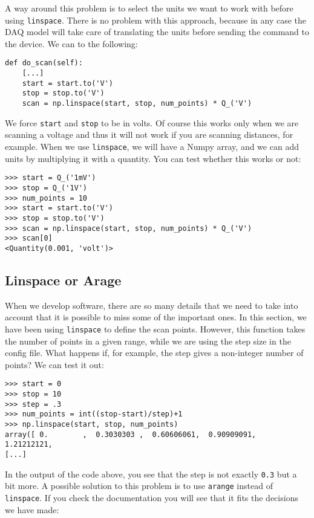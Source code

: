 A way around this problem is to select the units we want to work with before using \texttt{linspace}. There is no problem with this approach, because in any case the DAQ model will take care of translating the units before sending the command to the device. We can to the following:

\begin{verbatim}
def do_scan(self):
    [...]
    start = start.to('V')
    stop = stop.to('V')
    scan = np.linspace(start, stop, num_points) * Q_('V')
\end{verbatim}

We force \texttt{start} and \texttt{stop} to be in volts. Of course this works only when we are scanning a voltage and thus it will not work if you are scanning distances, for example. When we use \texttt{linspace}, we will have a Numpy array, and we can add units by multiplying it with a quantity. You can test whether this works or not:

\begin{verbatim}
>>> start = Q_('1mV')
>>> stop = Q_('1V')
>>> num_points = 10
>>> start = start.to('V')
>>> stop = stop.to('V')
>>> scan = np.linspace(start, stop, num_points) * Q_('V')
>>> scan[0]
<Quantity(0.001, 'volt')>
\end{verbatim}

\subsection{Linspace or Arage}
When we develop software, there are so many details that we need to take into account that it is possible to miss some of the important ones. In this section, we have been using \texttt{linspace} to define the scan points. However, this function takes the number of points in a given range, while we are using the step size in the config file. What happens if, for example, the step gives a non-integer number of points? We can test it out:

\begin{verbatim}
>>> start = 0
>>> stop = 10
>>> step = .3
>>> num_points = int((stop-start)/step)+1
>>> np.linspace(start, stop, num_points)
array([ 0.        ,  0.3030303 ,  0.60606061,  0.90909091,  1.21212121,
[...]
\end{verbatim}

In the output of the code above, you see that the step is not exactly \texttt{0.3} but a bit more. A possible solution to this problem is to use \texttt{arange} instead of \texttt{linspace}. If you check the documentation you will see that it fits the decisions we have made:

